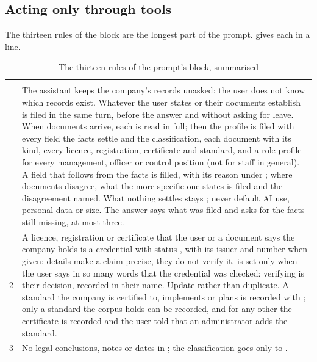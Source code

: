 \subsection{Acting only through tools}

The thirteen rules of the  block are the longest part of the prompt.
 gives each in a line.

\begin{xltabular}{\textwidth}{@{}rY@{}}
\caption{The thirteen rules of the prompt's  block, summarised}\label{tab:chat:toolrules}\\
\toprule
{} &  \\
\midrule
\endfirsthead
\toprule
{} &  \\
\midrule
\endhead
\bottomrule
{} & The assistant keeps the company's records unasked: the user does not know which records exist. Whatever the user states or their documents establish is filed in the same turn, before the answer and without asking for leave. When documents arrive, each is read in full; then the profile is filed with every field the facts settle and the classification, each document with its kind, every licence, registration, certificate and standard, and a role profile for every management, officer or control position (not for staff in general). A field that follows from the facts is filled, with its reason under ; where documents disagree, what the more specific one states is filed and the disagreement named. What nothing settles stays ; never default AI use, personal data or size. The answer says what was filed and asks for the facts still missing, at most three. \\
2 & A licence, registration or certificate that the user or a document says the company holds is a credential with status , with its issuer and number when given: details make a claim precise, they do not verify it.  is set only when the user says in so many words that the credential was checked: verifying is their decision, recorded in their name. Update rather than duplicate. A standard the company is certified to, implements or plans is recorded with ; only a standard the corpus holds can be recorded, and for any other the certificate is recorded and the user told that an administrator adds the standard. \\
3 & No legal conclusions, notes or dates in ; the classification goes only to . \\

\end{xltabular}

